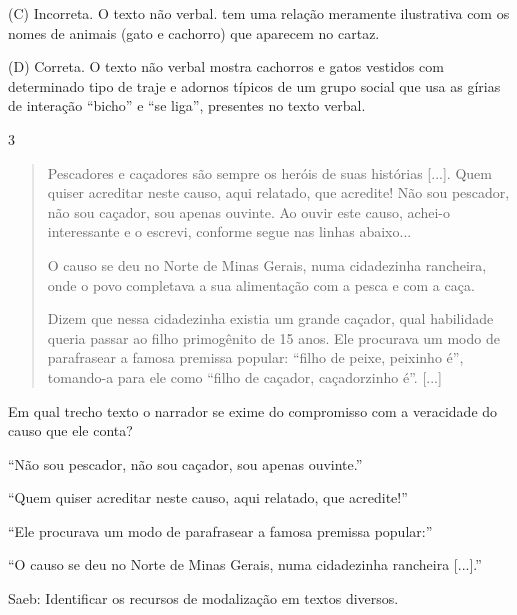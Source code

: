 (C) Incorreta. O texto não verbal. tem uma relação meramente ilustrativa
com os nomes de animais (gato e cachorro) que aparecem no cartaz.

(D) Correta. O texto não verbal mostra cachorros e gatos vestidos com
determinado tipo de traje e adornos típicos de um grupo social que usa
as gírias de interação ``bicho'' e ``se liga'', presentes no texto
verbal.

\num{3}

\begin{quote}
Pescadores e caçadores são sempre os heróis de suas histórias {[}...{]}.
Quem quiser acreditar neste causo, aqui relatado, que acredite! Não sou
pescador, não sou caçador, sou apenas ouvinte. Ao ouvir este causo,
achei-o interessante e o escrevi, conforme segue nas linhas abaixo...

O causo se deu no Norte de Minas Gerais, numa cidadezinha rancheira,
onde o povo completava a sua alimentação com a pesca e com a caça.

Dizem que nessa cidadezinha existia um grande caçador, qual habilidade
queria passar ao filho primogênito de 15 anos. Ele procurava um modo de
parafrasear a famosa premissa popular: ``filho de peixe, peixinho é'',
tomando-a para ele como ``filho de caçador, caçadorzinho é''. {[}...{]}
\end{quote}


Em qual trecho texto o narrador se exime do compromisso com a veracidade
do causo que ele conta?

\begin{escolha}
\item ``Não sou pescador, não sou caçador, sou apenas ouvinte.''

\item ``Quem quiser acreditar neste causo, aqui relatado, que acredite!''

\item ``Ele procurava um modo de parafrasear a famosa premissa popular:''

\item ``O causo se deu no Norte de Minas Gerais, numa cidadezinha rancheira
{[}...{]}.''
\end{escolha}

Saeb: Identificar os recursos de modalização em textos diversos.

